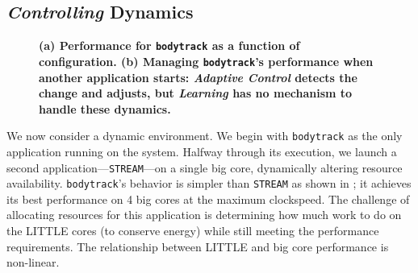 
\subsection{\emph{Controlling} Dynamics}



\begin{figure}
\centering
  \subfloat[]
  {
    
    \label{fig:BODYTRACK_timeline}    
  }
  \caption{\small \bf (a) Performance for \texttt{bodytrack} as a
    function of configuration. (b) Managing \texttt{bodytrack}'s
    performance when another application starts: \emph{Adaptive
      Control} detects the change and adjusts, but \emph{Learning} has
    no mechanism to handle these dynamics. }
  \label{fig:control}
\end{figure}


We now consider a dynamic environment.  We begin with
\texttt{bodytrack} as the only application running on the system.
Halfway through its execution, we launch a second
application---\texttt{STREAM}---on a single big core, dynamically
altering resource availability. \texttt{bodytrack}'s behavior is
simpler than \texttt{STREAM} as shown in
; it achieves its best performance on 4
big cores at the maximum clockspeed.  The challenge of allocating
resources for this application is determining how much work to do on
the LITTLE cores (to conserve energy) while still meeting the
performance requirements.  The relationship between LITTLE and big
core performance is non-linear. 

